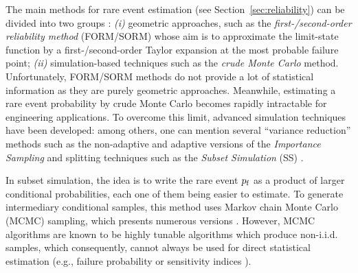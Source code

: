 
The main methods for rare event estimation (see Section~\ref{sec:reliability}) can be divided into two groups \citep{MorioBalesdent2015}: 
\textit{(i)} geometric approaches, such as the \emph{first-/second-order reliability method} (FORM/SORM) whose aim is to approximate the limit-state function by a first-/second-order Taylor expansion at the most probable failure point; 
\textit{(ii)} simulation-based techniques such as the \emph{crude Monte Carlo} method. 
Unfortunately, FORM/SORM methods do not provide a lot of statistical information as they are purely geometric approaches.
Meanwhile, estimating a rare event probability by crude Monte Carlo becomes rapidly intractable for engineering applications. 
To overcome this limit, advanced simulation techniques have been developed: among others, one can mention several ``variance reduction'' methods such as the non-adaptive and adaptive versions of the \emph{Importance Sampling} \citep{RubinsteinKroese1981} and splitting techniques \citep{cerou2012sequential} such as the \emph{Subset Simulation} (SS) \citet{AuBeck2001}.

In subset simulation, the idea is to write the rare event $p_\mathrm{f}$ as a product of larger conditional probabilities, each one of them being easier to estimate. 
To generate intermediary conditional samples, this method uses Markov chain Monte Carlo (MCMC) sampling, which presents numerous versions \citep{Papaioannou_PEM_2015}. 
However, MCMC algorithms are known to be highly tunable algorithms which produce non-i.i.d. samples, which consequently, cannot always be used for direct statistical estimation (e.g., failure probability or sensitivity indices \citealp{daveiga_iooss_2021}). 

